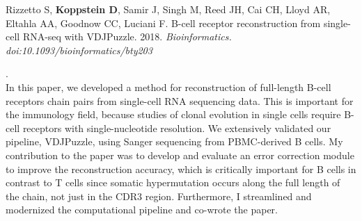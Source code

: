 \documentclass[10pt,a4paper]{article}
\begin{document}
\begin{enumerate}
{\item Rizzetto S, \textbf{Koppstein D}, Samir J, Singh M, Reed JH, Cai CH, Lloyd AR, Eltahla AA, Goodnow CC, Luciani F. B-cell receptor reconstruction from single-cell RNA-seq with VDJPuzzle. 2018. \textit{Bioinformatics. doi:10.1093/bioinformatics/bty203}}. \vspace{0.5em} \\

In this paper, we developed a method for reconstruction of full-length B-cell receptors chain pairs from single-cell RNA sequencing data. This is important for the immunology field, because studies of clonal evolution in single cells require B-cell receptors with single-nucleotide resolution. We extensively validated our pipeline, VDJPuzzle, using Sanger sequencing from PBMC-derived B cells. My contribution to the paper was to develop and evaluate an error correction module to improve the reconstruction accuracy, which is critically important for B cells in contrast to T cells since somatic hypermutation occurs along the full length of the chain, not just in the CDR3 region. Furthermore, I streamlined and modernized the computational pipeline and co-wrote the paper. \vspace{0.5em} \\

\end{enumerate}
\end{document}

